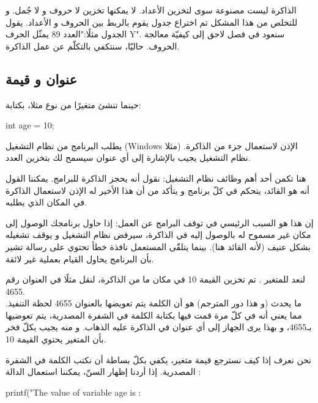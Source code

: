 الذاكرة ليست مصنوعة سوى لتخزين الأعداد. لا يمكنها تخزين لا حروف و لا جُمل. و للتخلص من هذا المشكل تم اختراع جدول يقوم بالربط بين الحروف و الأعداد. يقول الجدول مثلًا:"العدد 89 يمثّل الحرف
\textenglish{Y}".
سنعود في فصل لاحق إلى كيفيّة معالجة الحروف. حاليّا، سنتكفي بالتكلّم عن عمل الذاكرة.

\subsection{عنوان و قيمة}

حينما تنشئ متغيرًا
من نوع
مثلا، بكتابة:

\begin{Csource}
int age = 10;
\end{Csource}

يطلب البرنامج من نظام التشغيل
(\textenglish{Windows}
مثلا) الإذن لاستعمال جزء من الذاكرة. نظام التشغيل يجيب بالإشارة إلى أي عنوان سيسمح لك بتخزين العدد.

هنا تكمن أحد أهم وظائف نظام التشغيل: نقول أنه يحجز الذاكرة للبرامج. يمكننا القول أنه هو القائد، يتحكم في كلّ برنامج و يتأكد من أن هذا الأخير له الإذن لاستعمال الذاكرة في المكان الذي يطلبه.

\begin{information}
إن هذا هو السبب الرئيسي في توقف البرامج عن العمل: إذا حاول برنامجك الوصول إلى مكان غير مسموح له بالوصول إليه في الذاكرة، سيرفض نظام التشغيل و يوقف تشغيله بشكل عنيف (لأنه القائد هنا). بينما يتلقّى المستعمل نافذة خطأ تحتوي على رسالة تشير بأن البرنامج يحاول القيام بعملية غير لائقة.
\end{information}

لنعد للمتغير
.
تم تخزين القيمة 10 في مكان ما من الذاكرة، لنقل مثلًا في العنوان رقم 4655.\\
ما يحدث (و هذا دور المترجم) هو أن الكلمة
يتم تعويضها بالعنوان 4655 لحظة التنفيذ. مما يعني أنه في كلّ مرة قمت فيها بكتابة الكلمة
في الشفرة المصدرية، يتم تعوضيها بـ4655، و بهذا يرى الجهاز إلى أي عنوان في الذاكرة عليه الذهاب. و منه يجيب بكلّ فخر بأن المتغير
يحتوي القيمة 10.

نحن نعرف إذا كيف نسترجع قيمة متغير، يكفي بكلّ بساطة أن نكتب الكلمة
في الشفرة المصدرية. إذا أردنا إظهار السنّ، يمكننا استعمال الدالة
:

\begin{Csource}
printf("The value of variable age is : %
\end{Csource}

